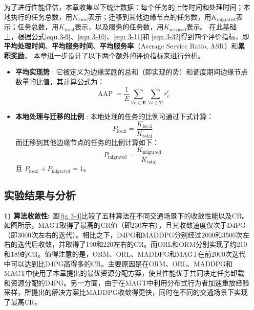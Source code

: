 为了进行性能评估，本章收集以下统计数据：每个任务的上传时间和处理时间；本地执行的任务总数，用$K_{\operatorname{local}}$表示；迁移到其他边缘节点的任务数，用$K_{\operatorname{migrated}}$表示；任务总数，用$K_{\operatorname{total}}$表示，以及服务的任务数，用$K_{\operatorname{serviced}}$表示。
在此基础上，根据公式\ref{equ 3-9}、\ref{equ 3-10}、\ref{equ 3-11}和 \ref{equ 3-32}得到四个评价指标，即\textbf{平均处理时间}、\textbf{平均服务时间}、\textbf{平均服务率}（Average Service Ratio, ASR）和\textbf{累积奖励}。
本章进一步设计了以下两个额外的评价指标来进行分析。
\begin{itemize}
	\item \textbf{平均实现势} : 它被定义为边缘奖励的总和（即实现的势）和调度期间边缘节点数量的比值，其计算公式为：
		\begin{equation}
		 	 \operatorname{AAP} = \frac{1}{E}\sum_{\forall e \in \mathbf{E}} \sum_{\forall t \in \mathbf{T}} r_{e}^{t}
		\end{equation}
	\item \textbf{本地处理与迁移的比例} : 本地处理的任务的比例可通过下式计算：
		\begin{equation}
			P_{\operatorname{local}} = \frac{K_{\operatorname{local}}}{K_{\operatorname{total}}}
		\end{equation}
		而迁移到其他边缘节点的任务的比例计算如下：
		\begin{equation}
			P_{\operatorname{migrated}} = \frac{K_{\operatorname{migrated}}}{K_{\operatorname{total}}}
		\end{equation}
		且 $P_{\operatorname{local}} +P_{\operatorname{migrated}} = 1$。
\end{itemize}

\subsection[\hspace{-2pt}实验结果与分析]{{ \hspace{-8pt}实验结果与分析}}

\textbf{1) 算法收敛性:} 图\ref{fig 3-4}比较了五种算法在不同交通场景下的收敛性能以及CR。如图所示，MAGT取得了最高的CR值（即230左右），且其收敛速度仅次于D4PG（即3000次左右的迭代）。相比之下，D4PG和MADDPG分别经过2000和3500次左右的迭代后收敛，并取得了190和220左右的CR。而ORL和ORM分别实现了约210和189的CR。值得注意的是，ORM、ORL、MADDPG和MAGT在前2000次迭代中可以达到比D4PG高得多的CR。主要原因是在ORM、ORL、MADDPG和MAGT中使用了本章提出的最优资源分配方案，使其性能优于共同决定任务卸载和资源分配的D4PG。另一方面，由于在MAGT中利用分布式行为者加速重放经验采样，所提出的解决方案比MADDPG收敛得更快，同时在不同的交通场景下实现了最高CR。

